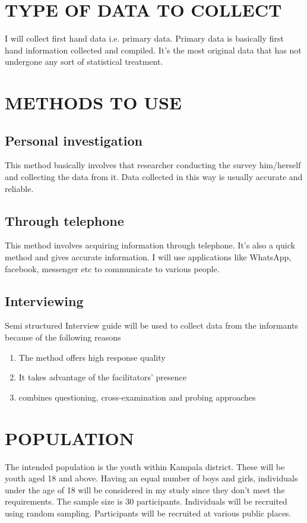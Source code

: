 \documentclass[12pt,letterpaper]{article}
\begin{document}
{\section{TYPE OF DATA TO COLLECT}
I will collect first hand data i.e. primary data.  Primary data is basically first hand information collected and compiled. It’s the most original data that has not undergone any sort of statistical treatment. 

\section{METHODS TO USE}
\subsection{Personal investigation}
This method basically involves that researcher conducting the survey him/herself and collecting the data from it. Data collected in this way is usually accurate and reliable. 

\subsection{Through telephone}
This method involves acquiring information through telephone. It’s also a quick method and gives accurate information. I will use applications like WhatsApp, facebook, messenger etc to communicate to various people.

\subsection{Interviewing}
                Semi structured Interview guide will be used to collect data from the informants because of the following reasons
                \begin{enumerate}
  
    \item The method offers high response quality\\
    \item It takes advantage of the facilitators’ presence \\
    \item combines questioning, cross-examination and probing approaches \\
    
    \end{enumerate}
    
 \section{POPULATION}
 The intended population is the youth within Kampala district. These will be youth aged 18 and above. Having an equal number of boys and girls, individuals under the age of 18 will be considered in my study since they don’t meet the requirements. The sample size is 30 participants. Individuals will be recruited using random sampling. Participants will be recruited at various public places.
               
}
\end{document}
